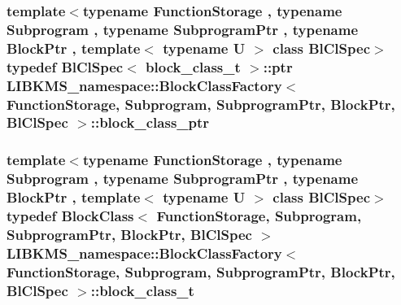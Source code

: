 \hypertarget{classLIBKMS__namespace_1_1BlockClassFactory_a882880cb8a33fcc808b41e283cea2dc3}{
\subsubsection[{block\-\_\-class\-\_\-ptr}]{\setlength{\rightskip}{0pt plus 5cm}template$<$typename Function\-Storage , typename Subprogram , typename Subprogram\-Ptr , typename Block\-Ptr , template$<$ typename U $>$ class Bl\-Cl\-Spec$>$ typedef Bl\-Cl\-Spec$<$ {\bf block\-\_\-class\-\_\-t} $>$\-::ptr {\bf L\-I\-B\-K\-M\-S\-\_\-namespace\-::\-Block\-Class\-Factory}$<$ {\bf Function\-Storage}, {\bf Subprogram}, Subprogram\-Ptr, Block\-Ptr, Bl\-Cl\-Spec $>$\-::{\bf block\-\_\-class\-\_\-ptr}}}\label{classLIBKMS__namespace_1_1BlockClassFactory_a882880cb8a33fcc808b41e283cea2dc3}
\hypertarget{classLIBKMS__namespace_1_1BlockClassFactory_ab6e704b98791fd6c718cfbb0fe2d2a5a}{
\subsubsection[{block\-\_\-class\-\_\-t}]{\setlength{\rightskip}{0pt plus 5cm}template$<$typename Function\-Storage , typename Subprogram , typename Subprogram\-Ptr , typename Block\-Ptr , template$<$ typename U $>$ class Bl\-Cl\-Spec$>$ typedef {\bf Block\-Class}$<$ {\bf Function\-Storage}, {\bf Subprogram}, Subprogram\-Ptr, Block\-Ptr, Bl\-Cl\-Spec $>$ {\bf L\-I\-B\-K\-M\-S\-\_\-namespace\-::\-Block\-Class\-Factory}$<$ {\bf Function\-Storage}, {\bf Subprogram}, Subprogram\-Ptr, Block\-Ptr, Bl\-Cl\-Spec $>$\-::{\bf block\-\_\-class\-\_\-t}}}\label{classLIBKMS__namespace_1_1BlockClassFactory_ab6e704b98791fd6c718cfbb0fe2d2a5a}


